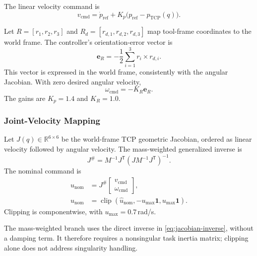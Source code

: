 \documentclass[conference]{IEEEtran}
\newcommand{\R}{\mathbb{R}}
\newcommand{\trans}{^{\mathsf T}}
\DeclareMathOperator{\clip}{clip}
\begin{document}
The linear velocity command is
\begin{equation}
    v_{\mathrm{cmd}}
    =
    \dot p_{\mathrm{ref}}
    +K_p\bigl(p_{\mathrm{ref}}-p_{\mathrm{TCP}}(q)\bigr).
\end{equation}

Let $R=[r_1,r_2,r_3]$ and
$R_d=[r_{d,1},r_{d,2},r_{d,3}]$ map tool-frame
coordinates to the world frame.
The controller's orientation-error vector is
\begin{equation}
    \mathbf e_R
    =
    -\frac12\sum_{i=1}^{3}
    r_i\times r_{d,i}.
    \label{eq:orientation-vector}
\end{equation}
This vector is expressed in the world frame,
consistently with the angular Jacobian.
With zero desired angular velocity,
\begin{equation}
    \omega_{\mathrm{cmd}}=-K_R\mathbf e_R.
\end{equation}
The gains are $K_p=1.4$ and $K_R=1.0$.

\subsubsection{Joint-Velocity Mapping}

Let $J(q)\in\R^{6\times6}$ be the world-frame
TCP geometric Jacobian, ordered as linear velocity
followed by angular velocity.
The mass-weighted generalized inverse is
\begin{equation}
    J^\#=
    M^{-1}J\trans
    \left(JM^{-1}J\trans\right)^{-1}.
    \label{eq:jacobian-inverse}
\end{equation}
The nominal command is
\begin{equation}
\begin{aligned}
    \widehat u_{\mathrm{nom}}
    &=
    J^\#
    \begin{bmatrix}
        v_{\mathrm{cmd}}\\
        \omega_{\mathrm{cmd}}
    \end{bmatrix},\\
    u_{\mathrm{nom}}
    &=
    \clip\left(
        \widehat u_{\mathrm{nom}},
        -u_{\max}\mathbf1,
        u_{\max}\mathbf1
    \right).
    \label{eq:nominal-command}
\end{aligned}
\end{equation}
Clipping is componentwise, with
$u_{\max}=0.7$\,rad/s.

The mass-weighted branch uses the direct inverse
in \eqref{eq:jacobian-inverse}, without a damping
term. It therefore requires a nonsingular task
inertia matrix; clipping alone does not address
singularity handling.
\end{document}

